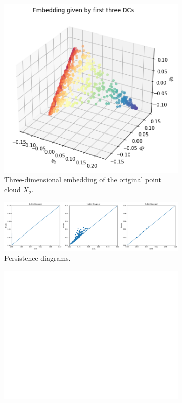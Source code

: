 \begin{figure}[H]
\centering
\begin{subfigure}[b]{0.2\textwidth}
    \includegraphics[width=\textwidth]{figures/topology/X2_embedding.png}
    \caption{Three-dimensional embedding of the original point cloud $X_2$.}
\end{subfigure}
\hfill
\begin{subfigure}[b]{0.75\textwidth}
    \includegraphics[width=\textwidth]{figures/topology/X2_H0.png}
    \caption{Persistence diagrams.}
\end{subfigure}
\begin{subfigure}[b]{0.25\textwidth}
\includegraphics[width=\textwidth]{figures/topology/white.png} 

\end{subfigure}
\end{figure}
